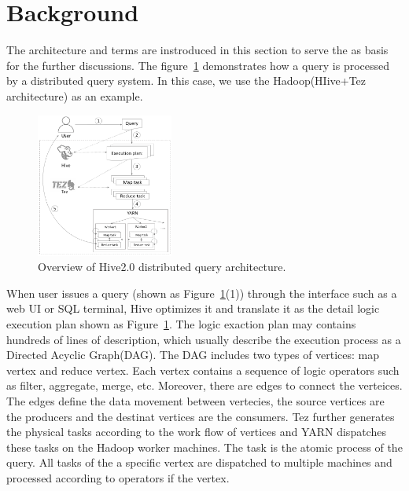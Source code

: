 \section{Background}
The architecture and terms are instroduced in this section to serve the as basis for the further discussions. 
The figure~\ref{fig:architecture} demonstrates how a query is processed by a distributed query system. In this case, we use the Hadoop(HIive+Tez architecture) as an example.

\begin{figure}[t]
	\centering
	\includegraphics[width=0.40\textwidth]{figures/background/arc.png}
	\vspace{-3mm}
	\caption{Overview of Hive2.0 distributed query architecture.}
	\label{fig:architecture}
	\vspace{-3mm}
\end{figure}

When user issues a query (shown as Figure~\ref{fig:architecture}(1)) through the interface such as a web UI or SQL terminal, Hive optimizes it and translate it as the detail logic execution plan shown as Figure~\ref{fig:architecture}. The logic exaction plan may contains hundreds of lines of description, which usually describe the execution process as a Directed Acyclic Graph(DAG). The DAG includes two types of vertices: map vertex and reduce vertex. Each vertex contains a sequence of logic operators such as filter, aggregate, merge, etc. Moreover, there are edges to connect the verteices. The edges define the data movement between vertecies, the source vertices are the producers and the destinat vertices are the consumers.
Tez further generates the physical tasks according to the work flow of vertices and YARN dispatches these tasks on the Hadoop worker machines.  The task is the atomic process of the query. All tasks of the a specific vertex are dispatched to multiple machines and processed according to operators if the vertex.  